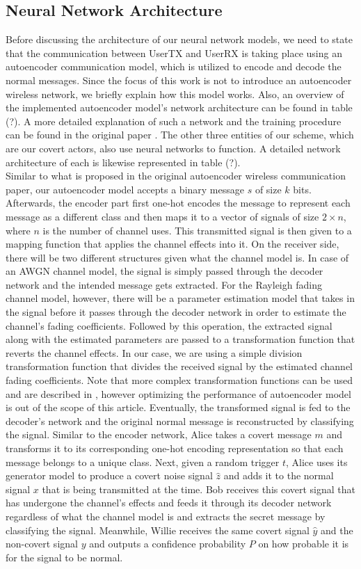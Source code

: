 \subsection{Neural Network Architecture}
Before discussing the architecture of our neural network models, we need to state that the communication between UserTX and UserRX is taking place using an autoencoder communication model, which is utilized to encode and decode the normal messages. Since the focus of this work is not to introduce an autoencoder wireless network, we briefly explain how this model works. Also, an overview of the implemented autoencoder model's network architecture can be found in table (?). A more detailed explanation of such a network and the training procedure can be found in the original paper \cite{o2017introduction}. The other three entities of our scheme, which are our covert actors, also use neural networks to function. A detailed network architecture of each is likewise represented in table (?).\\
Similar to what is proposed in the original autoencoder wireless communication paper, our autoencoder model accepts a binary message \(s\) of size \(k\) bits. Afterwards, the encoder part first one-hot encodes the message to represent each message as a different class and then maps it to a vector of signals of size \(2 \times n\), where \(n\) is the number of channel uses. This transmitted signal is then given to a mapping function that applies the channel effects into it. On the receiver side, there will be two different structures given what the channel model is. In case of an AWGN channel model, the signal is simply passed through the decoder network and the intended message gets extracted. For the Rayleigh fading channel model, however, there will be a parameter estimation model that takes in the signal before it passes through the decoder network in order to estimate the channel's fading coefficients. Followed by this operation, the extracted signal along with the estimated parameters are passed to a transformation function that reverts the channel effects. In our case, we are using a simple division transformation function that divides the received signal by the estimated channel fading coefficients. Note that more complex transformation functions can be used and are described in \cite{o2017introduction}, however optimizing the performance of autoencoder model is out of the scope of this article. Eventually, the transformed signal is fed to the decoder's network and the original normal message is reconstructed by classifying the signal. Similar to the encoder network, Alice takes a covert message \(m\) and transforms it to its corresponding one-hot encoding representation so that each message belongs to a unique class. Next, given a random trigger \(t\), Alice uses its generator model to produce a covert noise signal \(\hat{z}\) and adds it to the normal signal \(x\) that is being transmitted at the time. Bob receives this covert signal that has undergone the channel's effects and feeds it through its decoder network regardless of what the channel model is and extracts the secret message by classifying the signal. Meanwhile, Willie receives the same covert signal \(\hat{y}\) and the non-covert signal \(y\) and outputs a confidence probability \(P\) on how probable it is for the signal to be normal.
